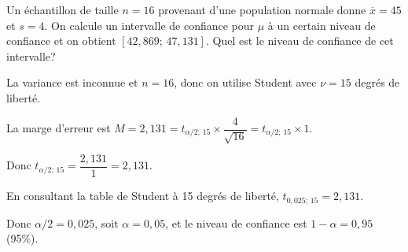 \begin{questions}



\pageblanche

\question[7] Un échantillon de taille $n=16$ provenant d'une population normale donne $\overline{x}=45$ et $s=4$. On calcule un intervalle de confiance pour $\mu$ à un certain niveau de confiance et on obtient $[42{,}869;\, 47{,}131]$. Quel est le niveau de confiance de cet intervalle? 

\begin{solution}
La variance est inconnue et $n=16$, donc on utilise Student avec $\nu=15$ degrés de liberté.

La marge d'erreur est $M=2{,}131=t_{\alpha/2;\,15}\times\dfrac{4}{\sqrt{16}}=t_{\alpha/2;\,15}\times 1$.

Donc $t_{\alpha/2;\,15}=\dfrac{2{,}131}{1}= 2{,}131$.

En consultant la table de Student à 15 degrés de liberté, $t_{0{,}025;\,15}=2{,}131$.

Donc $\alpha/2=0{,}025$, soit $\alpha=0{,}05$, et le niveau de confiance est $1-\alpha=0{,}95$ (95\%).
\end{solution}

\pageblanche

\end{questions}

